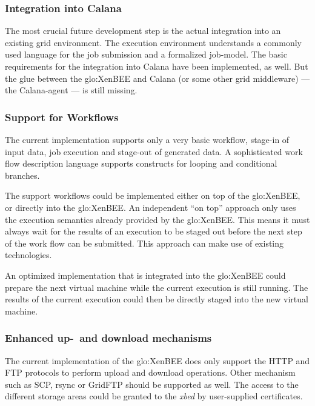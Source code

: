 \subsubsection{Integration into Calana}

The most crucial future development step is the actual integration into an
existing  grid  environment.   The  execution  environment  understands  a
commonly used language for the  job submission and a formalized job-model.
The  basic  requirements  for   the  integration  into  Calana  have  been
implemented,  as well.   But  the glue  between  the \gls{glo:XenBEE}  and
Calana (or some  other grid middleware) --- the  Calana-agent --- is still
missing.

\subsubsection{Support for Workflows}

The  current implementation  supports only  a  very basic  workflow,  \ie
stage-in of input  data, job execution and stage-out  of generated data. A
sophisticated  work  flow  description  language supports  constructs  for
looping and conditional branches.

The  support  workflows  could  be   implemented  either  on  top  of  the
\gls{glo:XenBEE}, or  directly into the  \gls{glo:XenBEE}.  An independent
``on top'' approach only uses  the execution semantics already provided by
the \gls{glo:XenBEE}. This means it must always wait for the results of an
execution to be  staged out before the  next step of the work  flow can be
submitted. This approach can make use of existing technologies.

An optimized  implementation that is integrated  into the \gls{glo:XenBEE}
could  prepare the  next virtual  machine while  the current  execution is
still  running.   The results  of  the  current  execution could  then  be
directly staged into the new virtual machine.

\subsubsection{Enhanced up-\ and download mechanisms}

The current  implementation of the \gls{glo:XenBEE} does  only support the
HTTP and  FTP protocols to  perform upload and download  operations. Other
mechanism such as  SCP, rsync or GridFTP should be  supported as well. The
access to the different storage  areas could be granted to the \emph{xbed}
by user-supplied certificates.

